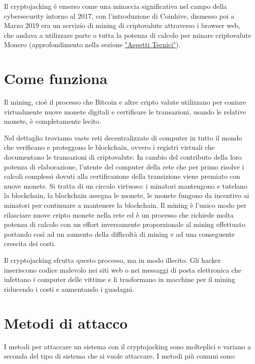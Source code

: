 \documentclass[12pt,a4paper]{article}
\begin{document}
Il cryptojacking è emerso come una minaccia significativa nel campo della
cybersecurity intorno al 2017, con l'introduzione di Coinhive, dismesso poi a
Marzo 2019 era un servizio di mining di criptovalute attraverso i browser web,
che andava a utilizzare parte o tutta la potenza di calcolo per minare
criptovalute Monero (approfondimento nella sezione
\hyperref[sec:aspetti_tecnici]{"Aspetti Tecnici"}). 

\section{Come funziona}
Il mining, cioè il processo che Bitcoin e altre cripto valute utilizzano per
coniare virtualmente nuove monete digitali e certificare le transazioni, usando
le relative monete, è completamente lecito. 

Nel dettaglio troviamo vaste reti decentralizzate di computer in tutto il mondo
che verificano e proteggono le blockchain, ovvero i registri virtuali che
documentano le transazioni di criptovalute. In cambio del contributo della loro
potenza di elaborazione, l'utente del computer della rete che per primo risolve
i calcoli complessi dovuti alla certificazione della transizione viene premiato
con nuove monete. Si tratta di un circolo virtuoso: i minatori mantengono e
tutelano la blockchain, la blockchain assegna le monete, le monete fungono da
incentivo ai minatori per continuare a mantenere la blockchain. Il mining è
l'unico modo per rilasciare nuove cripto monete nella rete ed è un processo che
richiede molta potenza di calcolo con un effort inversamente proporzionale al
mining effettuato portando così ad un aumento della difficoltà di mining e ad
una conseguente crescita dei costi.

Il cryptojacking sfrutta questo processo, ma in modo illecito. Gli hacker
inseriscono codice malevolo nei siti web o nei messaggi di posta elettronica che
infettano i computer delle vittime e li trasformano in macchine per il mining
riducendo i costi e aumentando i guadagni.

\section{Metodi di attacco}
I metodi per attaccare un sistema con il cryptojacking sono molteplici e variano
a seconda del tipo di sistema che si vuole attaccare. I metodi più comuni sono:
\end{document}
